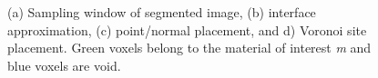 \begin{figure}[ht]
{\label{fig:vor2}}
%
\caption{(a) Sampling window of segmented image, (b) interface approximation, (c) point/normal placement, and d) Voronoi site placement. Green voxels belong to the material of interest \textit{m} and blue voxels are void. }
\label{fig:vor}
\end{figure}

